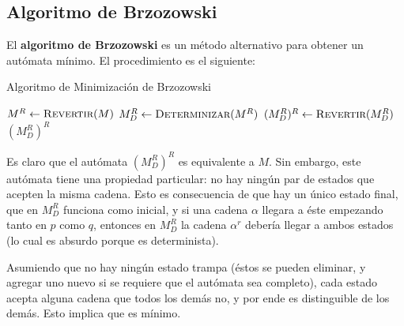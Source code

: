 \subsection{Algoritmo de Brzozowski}

El \textbf{algoritmo de Brzozowski} es un método alternativo para obtener un autómata mínimo. El procedimiento es el siguiente:

\begin{algorithm}[H]
    \caption{Algoritmo de Minimización de Brzozowski}
    \label{minimizacion-brzozowski}
    \begin{algorithmic}[1]
        \State $M^R \gets \textsc{Revertir}(M)$
        \State $M^R_D \gets \textsc{Determinizar}(M^R)$
        \State $(M^R_D)^R \gets \textsc{Revertir}(M^R_D)$
        \State \Return $(M^R_D)^R$
        \EndProcedure
    \end{algorithmic}
\end{algorithm}

Es claro que el autómata $(M^R_D)^R$ es equivalente a $M$. Sin embargo, este autómata tiene una propiedad particular: no hay ningún par de estados que acepten la misma cadena. Esto es consecuencia de que hay un único estado final, que en $M^R_D$ funciona como inicial, y si una cadena $\alpha$ llegara a éste empezando tanto en $p$ como $q$, entonces en $M^R_D$ la cadena $\alpha^r$ debería llegar a ambos estados (lo cual es absurdo porque es determinista).

Asumiendo que no hay ningún estado trampa (éstos se pueden eliminar, y agregar uno nuevo si se requiere que el autómata sea completo), cada estado acepta alguna cadena que todos los demás no, y por ende es distinguible de los demás. Esto implica que es mínimo.
